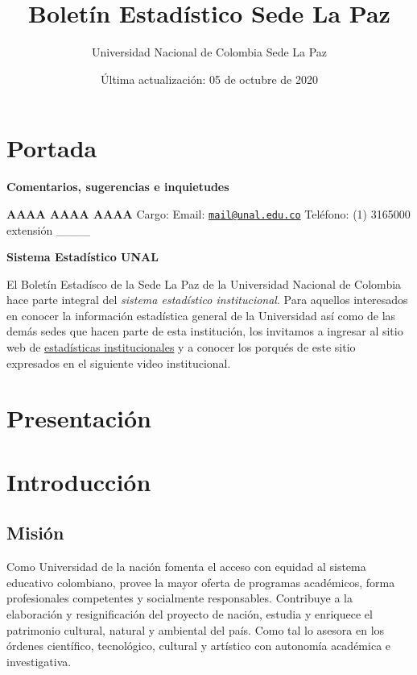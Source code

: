 \documentclass[
]{book}
\title{Boletín Estadístico Sede La Paz}
\author{ Universidad Nacional de Colombia Sede La Paz}
\date{Última actualización: 05 de octubre de 2020}
\begin{document}
\maketitle

{
\setcounter{tocdepth}{1}
\tableofcontents
}
\hypertarget{portada}{%
\chapter*{Portada}\label{portada}}

\textbf{Comentarios, sugerencias e inquietudes}

\textbf{AAAA AAAA AAAA}
Cargo:
Email: \href{mailto:mail@unal.edu.co}{\nolinkurl{mail@unal.edu.co}}
Teléfono: (1) 3165000 extensión \_\_\_\_

\textbf{Sistema Estadístico UNAL}

El Boletín Estadísco de la Sede La Paz de la Universidad Nacional de Colombia hace parte integral del \emph{sistema estadístico institucional}. Para aquellos interesados en conocer la información estadística general de la Universidad así como de las demás sedes que hacen parte de esta institución, los invitamos a ingresar al sitio web de \href{http://estadisticas.unal.edu.co/home/}{estadísticas institucionales} y a conocer los porqués de este sitio expresados en el siguiente video institucional.

\hypertarget{Presenta}{%
\chapter*{Presentación}\label{Presenta}}

\hypertarget{intro}{%
\chapter*{Introducción}\label{intro}}

\hypertarget{mision}{%
\section*{Misión}\label{mision}}

Como Universidad de la nación fomenta el acceso con equidad al sistema educativo colombiano, provee la mayor oferta de programas académicos, forma profesionales competentes y socialmente responsables. Contribuye a la elaboración y resignificación del proyecto de nación, estudia y enriquece el patrimonio cultural, natural y ambiental del país. Como tal lo asesora en los órdenes científico, tecnológico, cultural y artístico con autonomía académica e investigativa.
\end{document}
